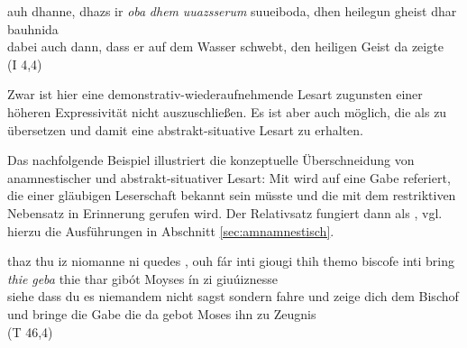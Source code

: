 %

\begin{exe}
\ex \label{ex:I2245}  auh dhanne, dhazs ir \textit{oba} \textit{dhem} \textit{uuazsserum} suueiboda, dhen heilegun gheist dhar bauhnida  \\
{dabei} {auch} {dann}, {dass} {er} {auf} {dem} {Wasser} {schwebt}, {den} {heiligen} {Geist} {da} {zeigte}\\
\glt {} (I 4,4)
\end{exe}

\noindent 
Zwar ist hier  eine demonstrativ-wiederaufnehmende Lesart zugunsten einer höheren Expressivität nicht auszuschließen. Es ist aber auch möglich, die  als  zu übersetzen und damit eine abstrakt-situative  Lesart zu erhalten. 



Das nachfolgende Beispiel illustriert die konzeptuelle Überschneidung von anamnestischer   und abstrakt-situativer  Lesart: Mit  wird auf eine Gabe referiert, die einer gläubigen Leserschaft bekannt sein müsste und die mit dem restriktiven Nebensatz in Erinnerung gerufen wird. Der Relativsatz fungiert dann als  \parencite[78--79]{Himmelmann1997}, vgl. hierzu die Ausführungen in Abschnitt \ref{sec:amnamnestisch}. 

%

\begin{exe}
\ex \label{ex:T9827}  {thaz} {thu} {iz} {niomanne} {ni} {quedes} {,} {ouh} {fár} {inti} {giougi} {thih} {themo} {biscofe} {inti} {bring} {\textit{thie}} {\textit{geba}} {thie} {thar} {gibót} {Moyses} {ín} {zi} {giuúiznesse} \\
{siehe} {dass} {du} {es} {niemandem} {nicht} {sagst} {} {sondern} {fahre} {und} {zeige} {dich} {dem} {Bischof} {und} {bringe} {die} {Gabe} {die} {da} {gebot} {Moses} {ihn} {zu} {Zeugnis} {}\\
\glt {} (T 46,4)
\end{exe}


